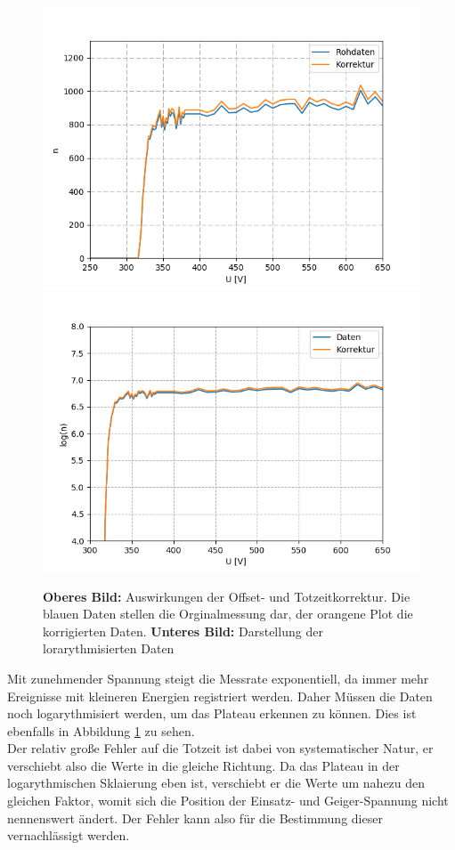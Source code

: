 \documentclass[12pt,a4paper]{article}
\begin{document}
\begin{figure}
\centering
\includegraphics[scale=0.9]{Bilder/GMTotzeit.PNG}
\includegraphics[scale=0.9]{Bilder/GMlogroh.PNG}
\caption{\textbf{Oberes Bild:} Auswirkungen der Offset- und Totzeitkorrektur. Die blauen Daten stellen die Orginalmessung dar, der orangene Plot die korrigierten Daten. \textbf{Unteres Bild:} Darstellung der lorarythmisierten Daten}
\label{fig:GMTotzeit}
\end{figure}

Mit zunehmender Spannung steigt die Messrate exponentiell, da immer mehr Ereignisse mit kleineren Energien registriert werden. Daher Müssen die Daten noch logarythmisiert werden, um das Plateau erkennen zu können. Dies ist ebenfalls in Abbildung \ref{fig:GMTotzeit} zu sehen.\\
Der relativ große Fehler auf die Totzeit ist dabei von systematischer Natur, er verschiebt also die Werte in die gleiche Richtung. Da das Plateau in der logarythmischen Sklaierung eben ist, verschiebt er die Werte um nahezu den gleichen Faktor, womit sich die Position der Einsatz- und Geiger-Spannung nicht nennenswert ändert. Der Fehler kann also für die Bestimmung dieser vernachlässigt werden.
\end{document}
